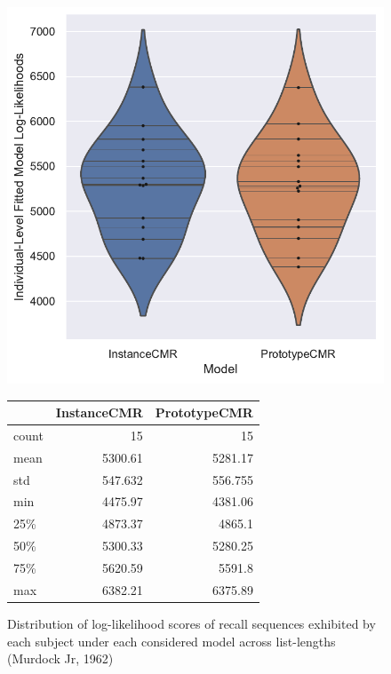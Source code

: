 \documentclass[
  letterpaper,
  DIV=11]{article}
\begin{document}
\begin{figure}

\begin{minipage}[c]{1.00\linewidth}

{\centering 

\includegraphics{./figures/individual_murdock1962.pdf}

}

\end{minipage}%
\newline
\begin{minipage}[c]{1.00\linewidth}

{\centering 

\begin{longtable}[]{@{}lrr@{}}
\toprule
& InstanceCMR & PrototypeCMR \\
\midrule
\endhead
count & 15 & 15 \\
mean & 5300.61 & 5281.17 \\
std & 547.632 & 556.755 \\
min & 4475.97 & 4381.06 \\
25\% & 4873.37 & 4865.1 \\
50\% & 5300.33 & 5280.25 \\
75\% & 5620.59 & 5591.8 \\
max & 6382.21 & 6375.89 \\
\bottomrule
\end{longtable}

}

\end{minipage}%

\caption{\label{fig-murdokafits}Distribution of log-likelihood scores of
recall sequences exhibited by each subject under each considered model
across list-lengths (Murdock Jr, 1962)}

\end{figure}
\end{document}
